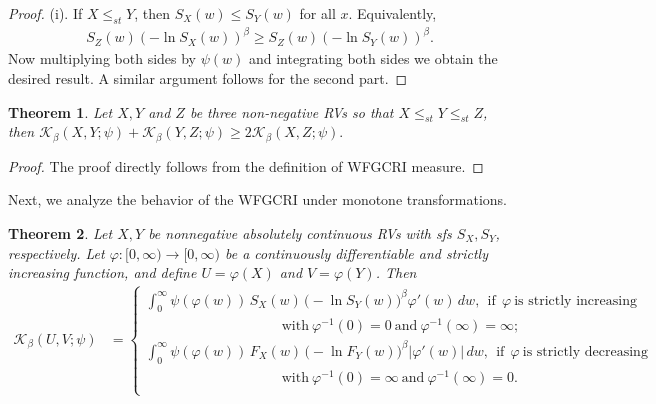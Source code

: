 \documentclass[12pt,a4paper]{article}
\numberwithin{equation}{section}
\newtheorem{theorem}{Theorem}[section]
\begin{document}
	\begin{proof}
(i).	If $X\leq_{st}Y$, then $S_X(w)\leq S_Y(w)$ for all $x$. Equivalently,
	\begin{align*}
S_Z(w)\left(-\ln S_X(w)\right)^\beta\geq S_Z(w)\left(-\ln S_Y(w)\right)^\beta.
	\end{align*}
	Now multiplying both sides by $\psi(w)$ and integrating both sides we obtain the desired result. A similar argument follows for the second part.
	\end{proof}
	\begin{theorem}
		Let $X,Y$ and $Z$ be three non-negative RVs so that $X\leq_{st} Y\leq_{st} Z$, then $\mathcal K_\beta(X,Y;\psi)+\mathcal K_\beta(Y,Z;\psi)\geq 2	\mathcal K_\beta(X,Z;\psi).$
	\end{theorem}
	\begin{proof}
		The proof directly follows from the definition of  WFGCRI measure.
	\end{proof}
	Next, we analyze the behavior of the WFGCRI under monotone transformations.
    \begin{theorem}
Let $X,Y$ be nonnegative absolutely continuous RVs with sfs $S_X, S_Y$, respectively.
Let $\varphi:[0,\infty)\to[0,\infty)$ be a continuously differentiable and 
strictly increasing function, and define $U=\varphi(X)$ and $V=\varphi(Y)$. Then 
\begin{align*}
	\mathcal K_\beta(U,V;\psi)&=\begin{cases}
		\int_{0}^{\infty}\psi(\varphi(w))\,S_X(w)\,
		\big(-\ln  S_Y(w)\big)^{\beta}\varphi'(w)\,dw,~~\text{if}~~\varphi~\text{is strictly increasing}\\~~~~~~~~~~~~~~~~~~~~~~~~~~~~~~~~~~~~~~~~~~~~\text{with}~\varphi^{-1}(0)=0~\text{and}~ \varphi^{-1}(\infty)=\infty;\\
			\int_{0}^{\infty}\psi(\varphi(w))\, F_X(w)\,
		\big(-\ln  F_Y(w)\big)^{\beta}|\varphi'(w)|\,dw,~~\text{if}~~\varphi~\text{is strictly decreasing}\\~~~~~~~~~~~~~~~~~~~~~~~~~~~~~~~~~~~~~~~~~~~~\text{with}~\varphi^{-1}(0)=\infty~\text{and}~ \varphi^{-1}(\infty)=0.\\
	\end{cases}
\end{align*}
\end{theorem}
\end{document}
